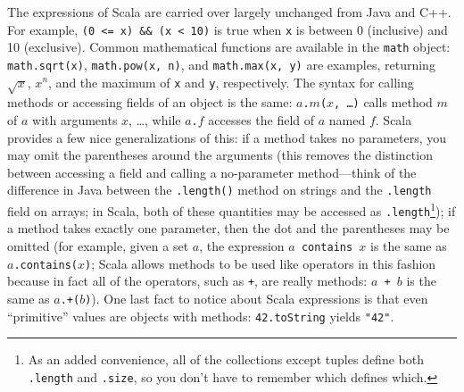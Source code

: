 \documentclass[11pt]{article}
\begin{document}
The expressions of Scala are carried over largely unchanged from Java and C++. For example, \verb|(0 <= x) && (x < 10)| is true when \texttt{x} is between 0 (inclusive) and 10 (exclusive). Common mathematical functions are available in the \texttt{math} object: \texttt{math.sqrt(x)}, \texttt{math.pow(x, n)}, and \texttt{math.max(x, y)} are examples, returning $\sqrt{x}$, $x^n$, and the maximum of \texttt{x} and \texttt{y}, respectively. The syntax for calling methods or accessing fields of an object is the same: \texttt{$a$.$m$($x$, \ldots)} calls method $m$ of $a$ with arguments $x$, \ldots, while \texttt{$a$.$f$} accesses the field of $a$ named $f$. Scala provides a few nice generalizations of this: if a method takes no parameters, you may omit the parentheses around the arguments (this removes the distinction between accessing a field and calling a no-parameter method---think of the difference in Java between the \texttt{.length()} method on strings and the \texttt{.length} field on arrays; in Scala, both of these quantities may be accessed as \texttt{.length}\footnote{As an added convenience, all of the collections except tuples define both \texttt{.length} and \texttt{.size}, so you don't have to remember which defines which.}); if a method takes exactly one parameter, then the dot and the parentheses may be omitted (for example, given a set $a$, the expression \texttt{$a$ contains $x$} is the same as \texttt{$a$.contains($x$)}; Scala allows methods to be used like operators in this fashion because in fact all of the operators, such as \texttt{+}, are really methods: \texttt{$a$ + $b$} is the same as \texttt{$a$.+($b$)}). One last fact to notice about Scala expressions is that even ``primitive'' values are objects with methods: \texttt{42.toString} yields \texttt{"42"}.
\end{document}

